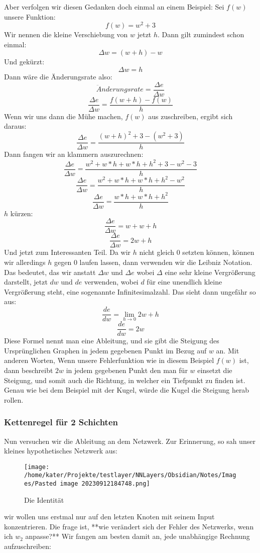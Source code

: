 \documentclass[12pt]{article}
\begin{document}
Aber verfolgen wir diesen Gedanken doch einmal an einem Beispiel:
Sei $f(w)$ unsere Funktion: $$f(w)=w^2+3$$
Wir nennen die kleine Verschiebung von $w$ jetzt $h$.
Dann gilt zumindest schon einmal: $$\Delta w=(w+h)-w$$Und gekürzt:$$\Delta w=h$$
Dann wäre die Änderungsrate also:$$\ddot{A}nderungsrate = \frac{\Delta e}{\Delta w}$$ $$\frac{\Delta e}{\Delta w}=\frac{f(w+h)-f(w)}{h}$$
Wenn wir uns dann die Mühe machen, $f(w)$ aus zuschreiben, ergibt sich daraus:
$$\frac{\Delta e}{\Delta w}=\frac{(w+h)^2+3-(w^2+3)}{h}$$
Dann fangen wir an klammern auszurechnen:
$$\frac{\Delta e}{\Delta w}=\frac{w^2+w*h+w*h+h^2+3-w^2-3}{h}$$
$$\frac{\Delta e}{\Delta w}=\frac{w^2+w*h+w*h+h^2-w^2}{h}$$
$$\frac{\Delta e}{\Delta w}=\frac{w*h+w*h+h^2}{h}$$
$h$ kürzen:
$$\frac{\Delta e}{\Delta w}=w+w+h$$
$$\frac{\Delta e}{\Delta w}=2w+h$$Und jetzt zum Interessanten Teil. Da wir $h$ nicht gleich 0 setzten können, können wir allerdings $h$ gegen 0 laufen lassen, dann verwenden wir die Leibniz Notation. Das bedeutet, das wir anstatt  $\Delta w$ und  $\Delta e$ wobei $\Delta$ eine sehr kleine Vergrößerung darstellt, jetzt $dw$ und $de$ verwenden, wobei $d$ für eine unendlich kleine Vergrößerung steht, eine sogenannte Infinitesimalzahl.
Das sieht dann ungefähr so aus:
$$\frac{de}{dw}=\lim_{h\to 0} 2w +h$$
$$\frac{de}{dw}=2w$$
Diese Formel nennt man eine Ableitung, und sie gibt die Steigung des Ursprünglichen Graphen in jedem gegebenen Punkt im Bezug auf $w$ an. Mit anderen Worten, Wenn unsere Fehlerfunktion wie in diesem Beispiel $f(w)$ ist, dann beschreibt $2w$ in jedem gegebenen Punkt den man für $w$ einsetzt die Steigung, und somit auch die Richtung, in welcher ein Tiefpunkt zu finden ist. Genau wie bei dem Beispiel mit der Kugel, würde die Kugel die Steigung herab rollen.\subsubsection{ Kettenregel für 2 Schichten}Nun versuchen wir die Ableitung an dem Netzwerk. Zur Erinnerung, so sah unser kleines hypothetisches Netzwerk aus:\begin{figure}[H]
\centering
\texttt{[image: /home/kater/Projekte/testlayer/NNLayers/Obsidian/Notes/Images/Pasted image 20230912184748.png]}
\caption{Die Identität}
\label{Was kommt hier rein?}\end{figure}wir wollen uns erstmal nur auf den letzten Knoten mit seinem Input konzentrieren. Die frage ist, **wie verändert sich der Fehler des Netzwerks, wenn ich $w_2$ anpasse?**
Wir fangen am besten damit an, jede unabhängige Rechnung aufzuschreiben:
\end{document}
